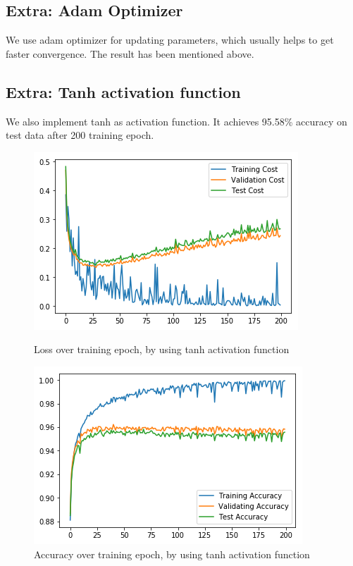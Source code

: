 \documentclass{article}
\begin{document}
\subsection{Extra: Adam Optimizer}
We use adam optimizer for updating parameters, which usually helps to get faster convergence. The result has been mentioned above.

\subsection{Extra: Tanh activation function}
We also implement tanh as activation function. It achieves 95.58\% accuracy on test data after 200 training epoch.
\begin{figure}[h]
	\begin{minipage}{0.48\textwidth}
		\centering
		\includegraphics[width=\textwidth]{pics/loss_tanh.png}
		\caption{Loss over training epoch, by using tanh activation function}
	\end{minipage}\hfill
	\begin{minipage}{0.48\textwidth}
		\centering
		\includegraphics[width=\textwidth]{pics/acc_tanh.png}
		\caption{Accuracy over training epoch, by using tanh activation function}
	\end{minipage}
\end{figure}
\end{document}
